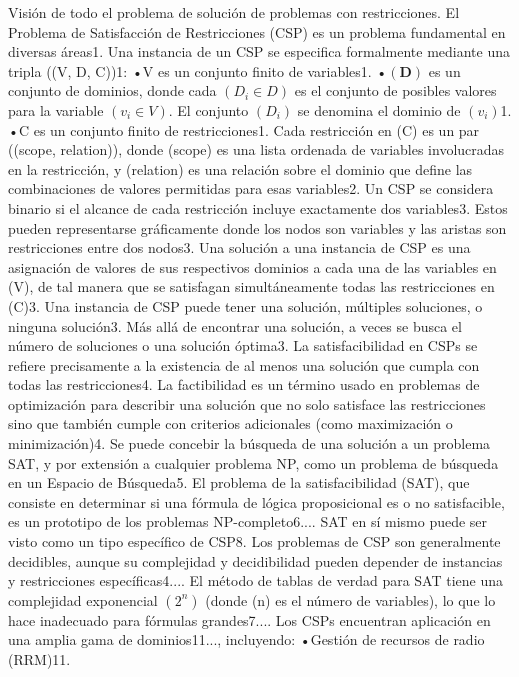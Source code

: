 Visión de todo el problema de solución de problemas con restricciones.
El Problema de Satisfacción de Restricciones (CSP) es un problema fundamental en diversas áreas1. Una instancia de un CSP se especifica formalmente mediante una tripla ((V, D, C))1:
•V es un conjunto finito de variables1.
•$(\mathbf{D})$ es un conjunto de dominios, donde cada $(D_i \in D)$ es el conjunto de posibles valores para la variable $(v_i \in V)$. El conjunto $(D_i)$ se denomina el dominio de $(v_i)$1.
•C es un conjunto finito de restricciones1. Cada restricción en (C) es un par ((scope, relation)), donde (scope) es una lista ordenada de variables involucradas en la restricción, y (relation) es una relación sobre el dominio que define las combinaciones de valores permitidas para esas variables2.
Un CSP se considera binario si el alcance de cada restricción incluye exactamente dos variables3. Estos pueden representarse gráficamente donde los nodos son variables y las aristas son restricciones entre dos nodos3.
Una solución a una instancia de CSP es una asignación de valores de sus respectivos dominios a cada una de las variables en (V), de tal manera que se satisfagan simultáneamente todas las restricciones en (C)3. Una instancia de CSP puede tener una solución, múltiples soluciones, o ninguna solución3. Más allá de encontrar una solución, a veces se busca el número de soluciones o una solución óptima3. La satisfacibilidad en CSPs se refiere precisamente a la existencia de al menos una solución que cumpla con todas las restricciones4. La factibilidad es un término usado en problemas de optimización para describir una solución que no solo satisface las restricciones sino que también cumple con criterios adicionales (como maximización o minimización)4.
Se puede concebir la búsqueda de una solución a un problema SAT, y por extensión a cualquier problema NP, como un problema de búsqueda en un Espacio de Búsqueda5.
El problema de la satisfacibilidad (SAT), que consiste en determinar si una fórmula de lógica proposicional es o no satisfacible, es un prototipo de los problemas NP-completo6.... SAT en sí mismo puede ser visto como un tipo específico de CSP8. Los problemas de CSP son generalmente decidibles, aunque su complejidad y decidibilidad pueden depender de instancias y restricciones específicas4.... El método de tablas de verdad para SAT tiene una complejidad exponencial $(2^n)$ (donde (n) es el número de variables), lo que lo hace inadecuado para fórmulas grandes7....
Los CSPs encuentran aplicación en una amplia gama de dominios11..., incluyendo:
•Gestión de recursos de radio (RRM)11.
